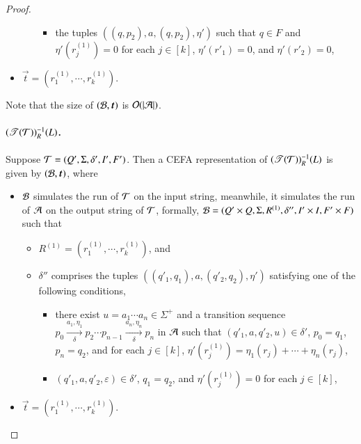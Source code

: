 \begin{proof}
\begin{itemize}
\begin{itemize}
\begin{itemize}
%
%
\item the tuples $((q, p_2), a, (q, p_2), \eta')$ such that $q \in F$ and $\eta'(r^{(1)}_j)=0$ for each $j \in [k]$, $\eta'(r'_1) = 0$, and $\eta'(r'_2) = 0$,
%
\end{itemize}
\end{itemize}
\item $\vec{t}=(r^{(1)}_1, \cdots, r^{(1)}_k)$.
\end{itemize}
Note that the size of $(\cB, \vec{t})$ is $\mathcal{O}(|\mathcal{A}|)$.
%
%
\paragraph*{$(\mathscr{T}(\mathcal{T}))^{-1}_R(L)$.}
%
Suppose $\mathcal{T} = (Q', \Sigma, \delta', I', F')$. Then a CEFA representation of $(\mathscr{T}(\mathcal{T}))^{-1}_R(L)$ is given by 
$(\cB, \vec{t})$, where 
\begin{itemize}
\item $\mathcal{B}$ simulates the run of $\mathcal{T}$ on the input string, meanwhile, it simulates the run of $\mathcal{A}$ on the output string of $\mathcal{T}$, formally, $\mathcal{B}= (Q' \times Q, \Sigma, R^{(1)}, \delta'', I' \times I, F' \times F)$ such that 
\begin{itemize}
\item $R^{(1)}  = (r^{(1)}_1, \cdots, r^{(1)}_k)$, and
\item $\delta''$ comprises the tuples $((q'_1, q_1), a, (q'_2, q_2), \eta')$ satisfying one of the following conditions,
\begin{itemize}
\item there exist $u = a_1 \cdots a_n \in \Sigma^+$ and a transition sequence $p_0 \xrightarrow[\delta]{a_1, \eta_1} p_2 \cdots p_{n-1} \xrightarrow[\delta]{a_n, \eta_n} p_{n}$ in $\mathcal{A}$ such that $(q'_1, a, q'_2, u) \in \delta'$, $p_0 = q_1$, $p_{n}= q_2$, and for each $j \in [k]$,  $\eta'(r^{(1)}_j) = \eta_1(r_j) + \cdots + \eta_n(r_j)$,
%
\item $(q'_1, a, q'_2, \varepsilon) \in \delta'$, $q_1 = q_2$, and $\eta'(r^{(1)}_j) =0$ for each $j \in [k]$,
\end{itemize}
\end{itemize}
%
\item $\vec{t}=(r^{(1)}_1, \cdots, r^{(1)}_k)$.
\end{itemize}

\end{proof}
